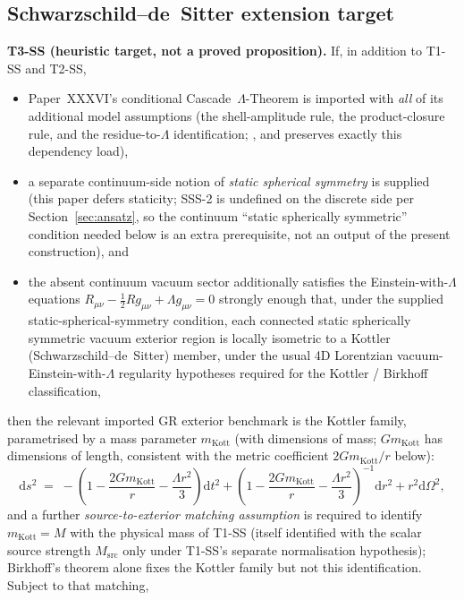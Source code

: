 \documentclass[12pt]{article}
\theoremstyle{definition}
\theoremstyle{remark}
\begin{document}
\subsection{Schwarzschild--de~Sitter extension target}

\textbf{T3-SS (heuristic target, not a proved proposition).} If, in addition to T1-SS and T2-SS,
\begin{itemize}
\item Paper~XXXVI's conditional Cascade~$\Lambda$-Theorem is imported with \emph{all} of its additional model assumptions (the shell-amplitude rule, the product-closure rule, and the residue-to-$\Lambda$ identification; \citealt{SmartXXXVI}, and \citealt{SmartXL} preserves exactly this dependency load),
\item a separate continuum-side notion of \emph{static spherical symmetry} is supplied (this paper defers staticity; SSS-2 is undefined on the discrete side per Section~\ref{sec:ansatz}, so the continuum ``static spherically symmetric'' condition needed below is an extra prerequisite, not an output of the present construction), and
\item the absent continuum vacuum sector additionally satisfies the Einstein-with-$\Lambda$ equations $R_{\mu\nu} - \tfrac{1}{2} R g_{\mu\nu} + \Lambda g_{\mu\nu} = 0$ strongly enough that, under the supplied static-spherical-symmetry condition, each connected static spherically symmetric vacuum exterior region is locally isometric to a Kottler (Schwarzschild--de~Sitter) member, under the usual 4D Lorentzian vacuum-Einstein-with-$\Lambda$ regularity hypotheses required for the Kottler / Birkhoff classification,
\end{itemize}
then the relevant imported GR exterior benchmark is the Kottler family, parametrised by a mass parameter $m_{\mathrm{Kott}}$ (with dimensions of mass; $G m_{\mathrm{Kott}}$ has dimensions of length, consistent with the metric coefficient $2 G m_{\mathrm{Kott}} / r$ below):
\begin{equation}
\mathrm{d}s^2 \;=\; -\left(1 - \frac{2 G m_{\mathrm{Kott}}}{r} - \frac{\Lambda r^2}{3}\right) \mathrm{d}t^2 + \left(1 - \frac{2 G m_{\mathrm{Kott}}}{r} - \frac{\Lambda r^2}{3}\right)^{-1} \mathrm{d}r^2 + r^2 \mathrm{d}\Omega^2,
\end{equation}
and a further \emph{source-to-exterior matching assumption} is required to identify $m_{\mathrm{Kott}} = M$ with the physical mass of T1-SS (itself identified with the scalar source strength $M_{\mathrm{src}}$ only under T1-SS's separate normalisation hypothesis); Birkhoff's theorem alone fixes the Kottler family but not this identification. Subject to that matching,
\end{document}
